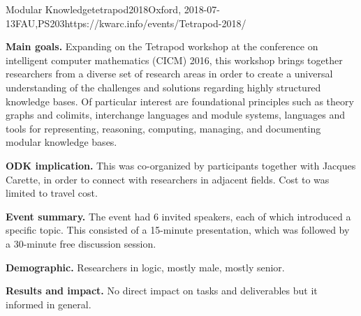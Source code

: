 \begin{event}{Modular Knowledge}{tetrapod2018}{Oxford, 2018-07-13}{FAU,PS}{20}{3}{https://kwarc.info/events/Tetrapod-2018/}

\textbf{Main goals.}
Expanding on the Tetrapod workshop at the conference on intelligent computer mathematics (CICM) 2016, this workshop brings together researchers from a diverse set of research areas in order to create a universal understanding of the challenges and solutions regarding highly structured knowledge bases.
Of particular interest are foundational principles such as theory graphs and colimits, interchange languages and module systems, languages and tools for representing, reasoning, computing, managing, and documenting modular knowledge bases.

\textbf{ODK implication.}
This was co-organized by \ODK participants together with Jacques Carette, in order to connect with researchers in adjacent fields.
Cost to \ODK was limited to travel cost.

\textbf{Event summary.}
The event had 6 invited speakers, each of which introduced a specific topic.
This consisted of a 15-minute presentation, which was followed by a 30-minute free discussion session.

\textbf{Demographic.}
Researchers in logic, mostly male, mostly senior.

\textbf{Results and impact.}
No direct impact on \ODK tasks and deliverables but it informed  in general.


\end{event}
